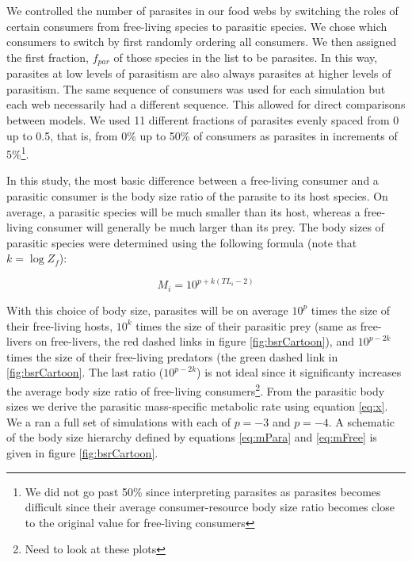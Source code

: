 \documentclass[11pt]{amsart}
\begin{document}
We controlled the number of parasites in our food webs by switching the roles of certain consumers from free-living species to parasitic species.  We chose which consumers to switch by first randomly ordering all consumers.  We then assigned the first fraction, $f_{par}$ of those species in the list to be parasites.  In this way, parasites at low levels of parasitism are also always parasites at higher levels of parasitism.  The same sequence of consumers was used for each simulation but each web necessarily had a different sequence.  This allowed for direct comparisons between models.  We used 11 different fractions of parasites evenly spaced from 0 up to 0.5, that is, from 0\% up to 50\% of consumers as parasites in increments of 5\%\footnote{We did not go past 50\% since interpreting parasites as parasites becomes difficult since their average consumer-resource body size ratio becomes close to the original value for free-living consumers}.

 In this study, the most basic difference between a free-living consumer and a parasitic consumer is the body size ratio of the parasite to its host species.  On average, a parasitic species will be much smaller than its host, whereas a free-living consumer will generally be much larger than its prey.  The body sizes of parasitic species were determined using the following formula (note that $k = \log Z_f$):

\begin{equation}
M_i = 10^{p + k(TL_i -2)} \label{eq:mPara}
\end{equation}

With this choice of body size, parasites will be on average $10^{p}$ times the size of their free-living hosts, $10^k$ times the size of their parasitic prey (same as free-livers on free-livers, the red dashed links in figure \ref{fig:bsrCartoon}), and $10^{p-2k}$ times the size of their free-living predators (the green dashed link in \ref{fig:bsrCartoon}.  The last ratio ($10^{p-2k}$) is not ideal since it significanty increases the average body size ratio of free-living consumers\footnote{Need to look at these plots}.  From the parasitic body sizes we derive the parasitic mass-specific metabolic rate using equation \eqref{eq:x}.  We a ran a full set of simulations with each of $p=-3$ and $p=-4$.  A schematic of the body size hierarchy defined by equations \eqref{eq:mPara} and \eqref{eq:mFree} is given in figure \ref{fig:bsrCartoon}.
\end{document}
